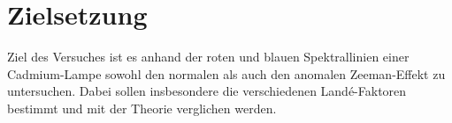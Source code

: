 
\section{Zielsetzung}
\label{sec:Zielsetzung}

Ziel des Versuches ist es anhand der roten und blauen Spektrallinien einer Cadmium-Lampe sowohl den normalen als auch den anomalen Zeeman-Effekt zu untersuchen. Dabei sollen insbesondere die verschiedenen Landé-Faktoren bestimmt und mit der Theorie verglichen werden. 
